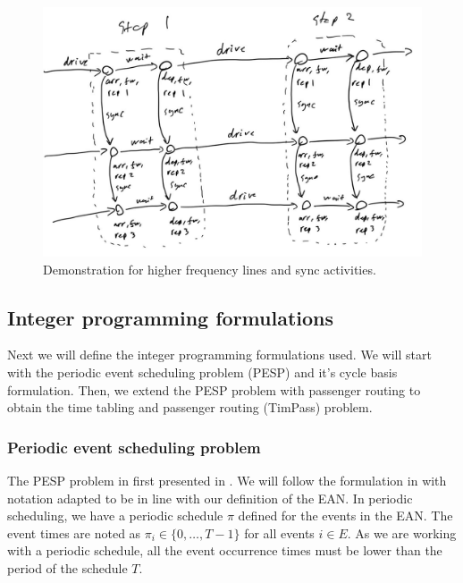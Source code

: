 \documentclass[english, 12pt, a4paper, sci, utf8, a-2b, online]{aaltothesis}
\begin{document}
\begin{figure}
    \centering
    \includegraphics[width=1.0\textwidth]{figures/sync-demo.jpg}
    \caption{Demonstration for higher frequency lines and sync activities.}
    \label{fig:sync-demo}
\end{figure}

\subsection{Integer programming formulations}
\label{sec:ips}

Next we will define the integer programming formulations used. We will start with the periodic event scheduling problem (PESP) and it's cycle basis formulation. Then, we extend the PESP problem with passenger routing to obtain the time tabling and passenger routing (TimPass) problem.

\subsubsection{Periodic event scheduling problem}

The PESP problem in first presented in \cite{pesp-original-1989}. We will follow the formulation in \cite{schiewe2020periodic} with notation adapted to be in line with our definition of the EAN. In periodic scheduling, we have a periodic schedule $\pi$ defined for the events in the EAN. The event times are noted as $\pi_i \in \{0, \dots, T-1\}$ for all events $i \in E$. As we are working with a periodic schedule, all the event occurrence times must be lower than the period of the schedule $T$. %
\end{document}
